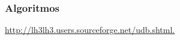 \subsubsection{Algoritmos}
\label{subsec:subsubsection:algoritmos:desenho}













\url{http://lh3lh3.users.sourceforge.net/udb.shtml.}
